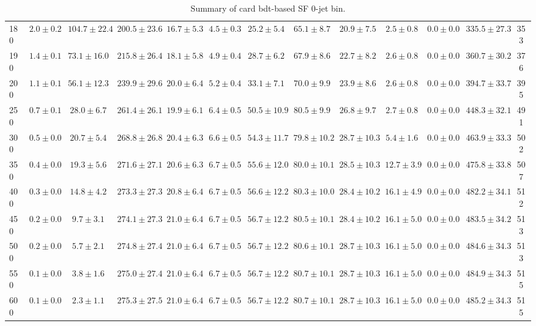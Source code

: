 \begin{table}
{\begin{center}
\begin{tabular}{l | c c | c c c c c c c c  | c c}
180 & $2.0\pm0.2$ & $104.7\pm22.4$ & $200.5\pm23.6$ & $16.7\pm5.3$ & $4.5\pm0.3$ & $25.2\pm5.4$ & $65.1\pm8.7$ & $20.9\pm7.5$ & $2.5\pm0.8$ & $0.0\pm0.0$ & $335.5\pm27.3$ & 353 \\
190 & $1.4\pm0.1$ & $73.1\pm16.0$ & $215.8\pm26.4$ & $18.1\pm5.8$ & $4.9\pm0.4$ & $28.7\pm6.2$ & $67.9\pm8.6$ & $22.7\pm8.2$ & $2.6\pm0.8$ & $0.0\pm0.0$ & $360.7\pm30.2$ & 376 \\
200 & $1.1\pm0.1$ & $56.1\pm12.3$ & $239.9\pm29.6$ & $20.0\pm6.4$ & $5.2\pm0.4$ & $33.1\pm7.1$ & $70.0\pm9.9$ & $23.9\pm8.6$ & $2.6\pm0.8$ & $0.0\pm0.0$ & $394.7\pm33.7$ & 395 \\
250 & $0.7\pm0.1$ & $28.0\pm6.7$ & $261.4\pm26.1$ & $19.9\pm6.1$ & $6.4\pm0.5$ & $50.5\pm10.9$ & $80.5\pm9.9$ & $26.8\pm9.7$ & $2.7\pm0.8$ & $0.0\pm0.0$ & $448.3\pm32.1$ & 491 \\
300 & $0.5\pm0.0$ & $20.7\pm5.4$ & $268.8\pm26.8$ & $20.4\pm6.3$ & $6.6\pm0.5$ & $54.3\pm11.7$ & $79.8\pm10.2$ & $28.7\pm10.3$ & $5.4\pm1.6$ & $0.0\pm0.0$ & $463.9\pm33.3$ & 502 \\
350 & $0.4\pm0.0$ & $19.3\pm5.6$ & $271.6\pm27.1$ & $20.6\pm6.3$ & $6.7\pm0.5$ & $55.6\pm12.0$ & $80.0\pm10.1$ & $28.5\pm10.3$ & $12.7\pm3.9$ & $0.0\pm0.0$ & $475.8\pm33.8$ & 507 \\
400 & $0.3\pm0.0$ & $14.8\pm4.2$ & $273.3\pm27.3$ & $20.8\pm6.4$ & $6.7\pm0.5$ & $56.6\pm12.2$ & $80.3\pm10.0$ & $28.4\pm10.2$ & $16.1\pm4.9$ & $0.0\pm0.0$ & $482.2\pm34.1$ & 512 \\
450 & $0.2\pm0.0$ & $9.7\pm3.1$ & $274.1\pm27.3$ & $21.0\pm6.4$ & $6.7\pm0.5$ & $56.7\pm12.2$ & $80.5\pm10.1$ & $28.4\pm10.2$ & $16.1\pm5.0$ & $0.0\pm0.0$ & $483.5\pm34.2$ & 513 \\
500 & $0.2\pm0.0$ & $5.7\pm2.1$ & $274.8\pm27.4$ & $21.0\pm6.4$ & $6.7\pm0.5$ & $56.7\pm12.2$ & $80.6\pm10.1$ & $28.7\pm10.3$ & $16.1\pm5.0$ & $0.0\pm0.0$ & $484.6\pm34.3$ & 513 \\
550 & $0.1\pm0.0$ & $3.8\pm1.6$ & $275.0\pm27.4$ & $21.0\pm6.4$ & $6.7\pm0.5$ & $56.7\pm12.2$ & $80.7\pm10.1$ & $28.7\pm10.3$ & $16.1\pm5.0$ & $0.0\pm0.0$ & $484.9\pm34.3$ & 515 \\
600 & $0.1\pm0.0$ & $2.3\pm1.1$ & $275.3\pm27.5$ & $21.0\pm6.4$ & $6.7\pm0.5$ & $56.7\pm12.2$ & $80.7\pm10.1$ & $28.7\pm10.3$ & $16.1\pm5.0$ & $0.0\pm0.0$ & $485.2\pm34.3$ & 515 \\\hline
\end{tabular}
\end{center}
}
\caption{Summary of card bdt-based SF 0-jet bin.}
\end{table}
